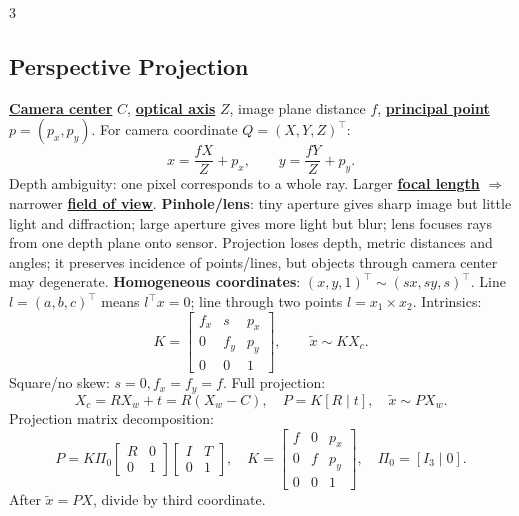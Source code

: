 \documentclass{article}
\numberwithin{equation}{subsection}
\newcommand{\key}[1]{\textbf{#1}}
\newcommand{\lowterm}[1]{\textbf{\underline{#1}}}
\begin{document}
\begin{multicols*}{3}
\subsection{Perspective Projection}
\lowterm{Camera center} $C$, \lowterm{optical axis} $Z$, image plane distance $f$, \lowterm{principal point} $p=(p_x,p_y)$. For camera coordinate $Q=(X,Y,Z)^\top$:
\[
x=\frac{fX}{Z}+p_x,\qquad y=\frac{fY}{Z}+p_y .
\]
Depth ambiguity: one pixel corresponds to a whole ray. Larger \lowterm{focal length} $\Rightarrow$ narrower \lowterm{field of view}.
\key{Pinhole/lens}: tiny aperture gives sharp image but little light and diffraction; large aperture gives more light but blur; lens focuses rays from one depth plane onto sensor. Projection loses depth, metric distances and angles; it preserves incidence of points/lines, but objects through camera center may degenerate.
\key{Homogeneous coordinates}: $(x,y,1)^\top\sim(sx,sy,s)^\top$. Line $l=(a,b,c)^\top$ means $l^\top x=0$; line through two points $l=x_1\times x_2$. Intrinsics:
\[
K=\begin{bmatrix}f_x&s&p_x\\0&f_y&p_y\\0&0&1\end{bmatrix},\qquad
\tilde x\sim KX_c .
\]
Square/no skew: $s=0,f_x=f_y=f$. Full projection:
\[
X_c=RX_w+t=R(X_w-C),\quad P=K[R\mid t],\quad \tilde x\sim PX_w .
\]
Projection matrix decomposition:
\[
P=K\Pi_0
\begin{bmatrix}R&0\\0&1\end{bmatrix}
\begin{bmatrix}I&T\\0&1\end{bmatrix},\quad
K=\begin{bmatrix}f&0&p_x\\0&f&p_y\\0&0&1\end{bmatrix},\quad
\Pi_0=[I_3\mid0].
\]
After $\tilde x=PX$, divide by third coordinate.


\end{multicols*}
\end{document}
